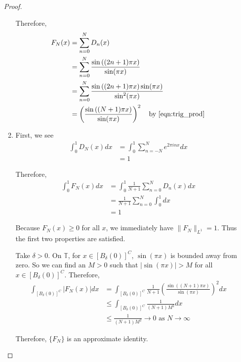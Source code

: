 \documentclass[a4paper]{article}
\begin{document}
\begin{enumerate}
\begin{proof}
\begin{enumerate}
      Therefore,
      \begin{align*}
        F_N(x) &= \sum_{n=0}^N D_n(x) \\
        &= \sum_{n=0}^N \frac{\sin \left( (2n+1) \pi x \right)}{\sin (\pi x)} \\
        &= \sum_{n=0}^N \frac{\sin \left( (2n+1) \pi x \right) \sin ( \pi x )}{\sin^2 (\pi x)} \\
        &= \left( \frac{\sin \left( (N+1) \pi x \right)}{\sin (\pi x)} \right)^2 \quad \text{by \eqref{eqn:trig_prod}}
      \end{align*}

    \item
      First, we see
      \begin{align*}
        \int_{0}^{1} D_N(x) dx &= \int_{0}^{1} \sum_{n=-N}^N e^{2 \pi i n x} dx \\
        &= 1
      \end{align*}

      Therefore,
      \begin{align*}
        \int_{0}^{1} F_N(x) dx &= \int_{0}^{1} \frac{1}{N+1} \sum_{n=0}^N D_n(x) dx \\
        &= \frac{1}{N+1} \sum_{n=0}^N \int_{0}^{1} dx \\
        &= 1
      \end{align*}

      Because $F_N(x) \geq 0$ for all $x$, we immediately have $\|F_N\|_{L^1} = 1$.
      Thus the first two properties are satisfied.

      Take $\delta > 0$. On $\mathbb{T}$, for $x \in [B_\delta(0)]^C$, $\sin(\pi x)$ is bounded away from zero. So we can find an $M>0$ such that
      $|\sin(\pi x)| > M$ for all $x \in [B_\delta(0)]^C$.
      Therefore,
      \begin{align*}
        \int_{[B_\delta(0)]^C}^{} | F_N(x) | dx &= \int_{[B_\delta(0)]^C}^{} \frac{1}{N+1} \left( \frac{\sin \left( (N+1) \pi x \right)}{\sin(\pi x)}
        \right)^2 dx \\
        &\leq \int_{[B_\delta(0)]^C}^{} \frac{1}{(N+1)M^2} dx \\
        &\leq \frac{1}{(N+1)M^2} \to 0 \text{ as } N \to \infty
      \end{align*}

      Therefore, $\{F_N\}$ is an approximate identity.
  \end{enumerate}

\end{proof}


\end{enumerate}
\end{document}
